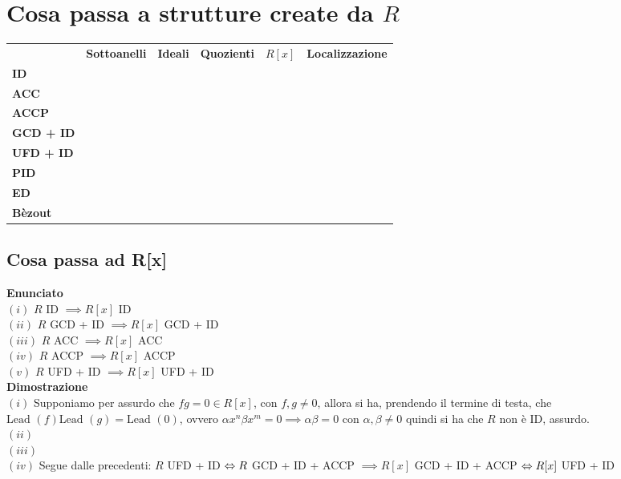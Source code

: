 \documentclass[a4paper,GeneralMath,NoNotes]{stdmdoc}
\newcommand{\Enunciato}{\vskip 0.05cm \noindent \textbf{Enunciato} \\ }
\renewcommand{\Dimostrazione}{\vskip 0.05cm \noindent \textbf{Dimostrazione} \\ }
\newcommand{\Lead}{\text{Lead }}
\begin{document}
	\section*{Cosa passa a strutture create da $R$}
	\begin{tabular}{lccccc}
	               & {\bf Sottoanelli} & {\bf Ideali} & {\bf Quozienti} & {\bf $R[x]$} & {\bf Localizzazione} \\
	{\bf ID}       & \checkmark        & \checkmark   &                 & \checkmark   & \\
	{\bf ACC}      &                   &              &                 & \checkmark   & \\
	{\bf ACCP}     &                   &              &                 & \checkmark   & \\
	{\bf GCD + ID} &                   &              &                 & \checkmark   & \\
	{\bf UFD + ID} &                   &              &                 & \checkmark   & \\
	{\bf PID}      &                   &              &                 & \crossmark   & \\
	{\bf ED}       &                   &              &                 & \crossmark   & \\
	{\bf Bèzout}   &                   &              &                 &              & \\
	
	\end{tabular} \vskip 1cm

	
	\subsection{Cosa passa ad R[x]}
	\Enunciato
		$(i)$ $R$ ID $\implies R[x]$ ID \\
		$(ii)$ $R$ GCD + ID $\implies R[x]$ GCD + ID \\
		$(iii)$ $R$ ACC $\implies R[x]$ ACC \\
		$(iv)$ $R$ ACCP $\implies R[x]$ ACCP \\
		$(v)$ $R$ UFD + ID $\implies R[x]$ UFD + ID \\

	\Dimostrazione
		$(i)$ Supponiamo per assurdo che $fg = 0 \in R[x]$, con $f, g \neq 0$, allora si ha, prendendo il termine di testa, che $\Lead(f)\Lead(g) = \Lead(0)$, ovvero $\alpha x^n \beta x^m = 0 \implies \alpha \beta = 0$ con $\alpha, \beta \neq 0$ quindi si ha che $R$ non è ID, assurdo. \\
		$(ii)$ \\
		$(iii)$ \\
		$(iv)$ Segue dalle precedenti: $R$ UFD + ID $\Leftrightarrow R$ GCD + ID + ACCP $\implies R[x]$ GCD + ID + ACCP $\Leftrightarrow R[x]$ UFD + ID \\
\end{document}
